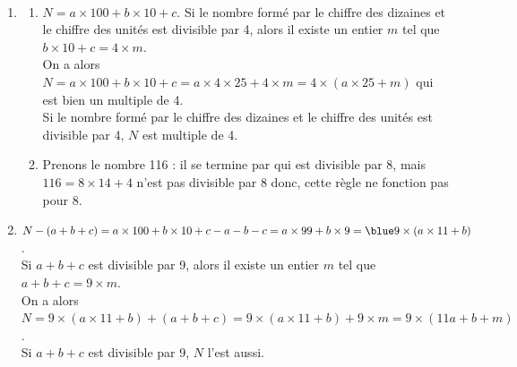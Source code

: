 \begin{corrige}
\ \\ [-5mm]
   \begin{enumerate}
      \item
         \begin{enumerate}
            \item $N =a\times100+b\times10+c$. Si le nombre formé par le chiffre des dizaines et le chiffre des unités est divisible par 4, alors il existe un entier $m$ tel que $b\times10+c =4\times m$. \\
                On a alors $N =a\times100+b\times10+c =a\times4\times25+4\times m =4\times(a\times25+m)$ qui est bien un multiple de 4. \\
                {\blue Si le nombre formé par le chiffre des dizaines et le chiffre des unités est divisible par 4, $N$ est multiple de 4}.
            \item Prenons le nombre 116 : il se termine par  \fg{} qui est divisible par 8, mais $116 =8\times14+4$ n'est pas divisible par 8 donc, {\blue cette règle ne fonction pas pour 8}. 
         \end{enumerate}
      \setcounter{enumi}{1}
      \item $N-(a+b+c) =a\times100+b\times10+c-a-b-c =a\times99+b\times9 ={\blue 9\times(a\times11+b)}$. \\
      Si $a+b+c$ est divisible par 9, alors il existe un entier $m$ tel que $a+b+c =9\times m$. \\
      On a alors $N =9\times(a\times11+b)+(a+b+c) =9\times(a\times11+b)+9\times m =9\times(11a+b+m)$. \\
         {\blue Si $a+b+c$ est divisible par 9, $N$ l'est aussi}.
   \end{enumerate}
\end{corrige}


\bigskip


